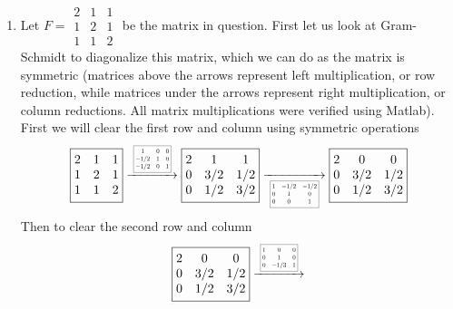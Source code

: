 \documentclass[12pt]{amsart}
\theoremstyle{definition}
\begin{document}
\begin{enumerate}
\item Let $F=\boxed{\begin{matrix}
    2 & 1 & 1\\
    1 & 2 & 1\\
    1 & 1 & 2
\end{matrix}}$ be the matrix in question. First let us look at Gram-Schmidt to diagonalize this matrix, which we can do as the matrix is symmetric (matrices above the arrows represent left multiplication, or row reduction, while matrices under the arrows represent right multiplication, or column reductions. All matrix multiplications were verified using Matlab). First we will clear the first row and column using symmetric operations
$$\boxed{\begin{matrix}
    2 & 1 & 1\\
    1 & 2 & 1\\
    1 & 1 & 2
\end{matrix}}
\xrightarrow[]{\scalebox{0.5}{\;
\boxed{\begin{matrix}
    1 & 0 & 0\\
    -1/2 & 1 & 0\\
    -1/2 & 0 & 1
\end{matrix}}\;}}
\boxed{\begin{matrix}
    2 & 1 & 1\\
    0 & 3/2 & 1/2\\
    0 & 1/2 & 3/2
\end{matrix}}
\xrightarrow[\scalebox{0.5}{\;
\boxed{\begin{matrix}
    1 & -1/2 & -1/2\\
    0 & 1 & 0\\
    0 & 0 & 1
\end{matrix}}\;}]{}
\boxed{\begin{matrix}
    2 & 0 & 0\\
    0 & 3/2 & 1/2\\
    0 & 1/2 & 3/2
\end{matrix}}$$
Then to clear the second row and column
$$\boxed{\begin{matrix}
    2 & 0 & 0\\
    0 & 3/2 & 1/2\\
    0 & 1/2 & 3/2
\end{matrix}}
\xrightarrow[]{\scalebox{0.5}{\;
\boxed{\begin{matrix}
    1 & 0 & 0\\
    0 & 1 & 0\\
    0 & -1/3 & 1
\end{matrix}}\;}}
$$
\end{enumerate}
\end{document}
